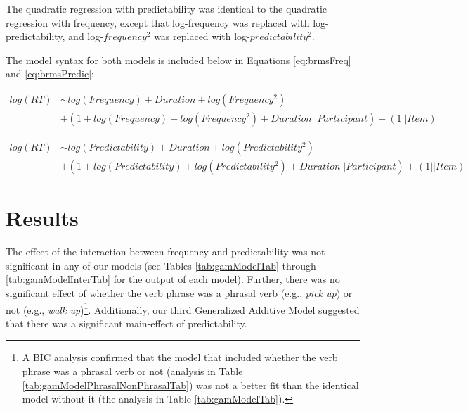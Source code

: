 \documentclass[
  man,floatsintext]{apa6}
\begin{document}
The quadratic regression with predictability was identical to the quadratic regression with frequency, except that log-frequency was replaced with log-predictability, and log-\(frequency^2\) was replaced with log-\(predictability^2.\)

The model syntax for both models is included below in Equations \eqref{eq:brmsFreq} and \eqref{eq:brmsPredic}:

\begin{equation}
\begin{aligned}
\label{eq:brmsFreq}
log(RT) & \sim log(Frequency) + Duration + log(Frequency^2) \\ & + (1 + log(Frequency) + log(Frequency^2) + Duration || Participant) + (1 || Item)
\end{aligned}
\end{equation}

\begin{equation}
\begin{aligned}
\label{eq:brmsPredic}
log(RT) & \sim  log(Predictability) + Duration + log(Predictability^2) \\ & + (1 + log(Predictability) + log(Predictability^2) + Duration || Participant) + (1 || Item)
\end{aligned}
\end{equation}

\section{Results}\label{results}

The effect of the interaction between frequency and predictability was not significant in any of our models (see Tables \ref{tab:gamModelTab} through \ref{tab:gamModelInterTab} for the output of each model). Further, there was no significant effect of whether the verb phrase was a phrasal verb (e.g., \emph{pick up}) or not (e.g., \emph{walk up})\footnote{A BIC analysis confirmed that the model that included whether the verb phrase was a phrasal verb or not (analysis in Table \ref{tab:gamModelPhrasalNonPhrasalTab}) was not a better fit than the identical model without it (the analysis in Table \ref{tab:gamModelTab}).}. Additionally, our third Generalized Additive Model suggested that there was a significant main-effect of predictability.
\end{document}
